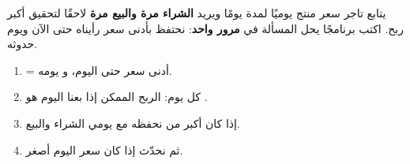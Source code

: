 \begin{statement}
يتابع تاجر سعر منتج يوميًا لمدة  يومًا ويريد \textbf{الشراء مرة والبيع مرة} لاحقًا لتحقيق أكبر ربح. اكتب برنامجًا يحل المسألة في \textbf{مرور واحد}: نحتفظ بأدنى سعر رأيناه حتى الآن ويوم حدوثه.
\end{statement}
\begin{stepsbox}\begin{enumerate}
\item {} = أدنى سعر حتى اليوم، و يومه.
\item كل يوم: الربح الممكن إذا بعنا اليوم هو .
\item إذا كان أكبر من  نحفظه مع يومي الشراء والبيع.
\item ثم نحدّث  إذا كان سعر اليوم أصغر.
\end{enumerate}\end{stepsbox}
